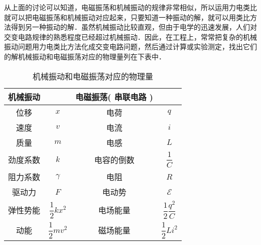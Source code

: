 
从上面的讨论可以知道，电磁振荡和机械振动的规律非常相似，所以运用力电类比就可以把电磁振荡和机械振动对应起来，只要知道一种振动的解，就可以用类比方法得到另一种振动的解．虽然机械振动比较直观，但由于电学的迅速发展，人们对交变电路规律的熟悉程度已经超过机械振动．因此，在工程上，常常把复杂的机械振动问题用力电类比方法化成交变电路问题，然后通过计算或实验测定，找出它们的解机械振动和电磁振荡对应的物理量列在下表中．

\begin{table}[ht]
\centering
\caption{机械振动和电磁振荡对应的物理量}\label{MeElec_tab1}
\begin{tabular}{cccc}
\hline  机械振动  & &  电磁振荡(  串联电路 ) &\\ \hline  位移  & $x$ &  电荷  & $q$ \\ \hline  速度  & $v $&  电流  & $i$ \\ \hline  质量  & $m$ &  电感  & $L$ \\ \hline  劲度系数  & $k$ &  电容的倒数  & $\dfrac1C$ \\ \hline  阻力系数  & $\gamma$ &  电阻  & $R$  \\ \hline  驱动力  &$F$ &  电动势  & $\mathscr E$  \\ \hline  弹性势能  &  $\dfrac12 k x^2$ &  电场能量  & $\dfrac12 \dfrac{q^2}C$ \\ \hline  动能  & $\dfrac12 m v^2$ &  磁场能量  &  $\dfrac12 L i^2$ \\ \hline
\end{tabular}
\end{table}